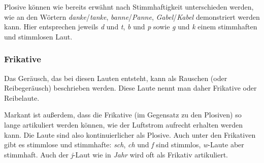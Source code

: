 Plosive können wie bereits erwähnt nach Stimmhaftigkeit unterschieden werden, wie an den Wörtern \textit{danke}/\textit{tanke}, \textit{banne}/\textit{Panne}, \textit{Gabel}/\textit{Kabel} demonstriert werden kann.
Hier entsprechen jeweils \textit{d} und \textit{t}, \textit{b} und \textit{p} sowie \textit{g} und \textit{k} einem stimmhaften und stimmlosen Laut.

\subsubsection{Frikative}


Das Geräusch, das bei diesen Lauten entsteht, kann als Rauschen (oder Reibegeräusch) beschrieben werden.
Diese Laute nennt man daher Frikative oder Reibelaute.


Markant ist außerdem, dass die Frikative (im Gegensatz zu den Plosiven) so lange artikuliert werden können, wie der Luftstrom aufrecht erhalten werden kann.
Die Laute sind also kontinuierlicher als Plosive.
Auch unter den Frikativen gibt es stimmlose und stimmhafte: \textit{sch}, \textit{ch} und \textit{f} sind stimmlos, \textit{w}-Laute aber \zB stimmhaft.
Auch der \textit{j}-Laut wie in \textit{Jahr} wird oft als Frikativ artikuliert.

